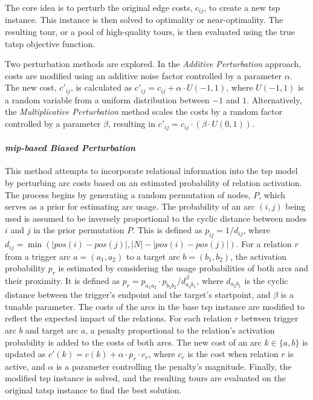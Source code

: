 \documentclass[twocolumn, switch]{article} %
\begin{document}
The core idea is to perturb the original edge costs, $c_{ij}$, to create a new \gls{tsp} instance.
This instance is then solved to optimality or near-optimality. The resulting tour, or a pool of high-quality tours, is then evaluated using the true \gls{tatsp} objective function.

Two perturbation methods are explored. In the \textit{Additive Perturbation} approach, costs are modified using an additive noise factor controlled by a parameter $\alpha$. The new cost, $c'_{ij}$, is calculated as $c'_{ij} = c_{ij} + \alpha \cdot U(-1, 1)$, where $U(-1, 1)$ is a random variable from a uniform distribution between $-1$ and $1$. Alternatively, the \textit{Multiplicative Perturbation} method scales the costs by a random factor controlled by a parameter $\beta$, resulting in $c'_{ij} = c_{ij} \cdot (\beta \cdot U(0, 1))$.

\paragraph{\textit{\gls{mip}-based Biased Perturbation}}
This method attempts to incorporate relational information into the \gls{tsp} model by perturbing arc costs based on an estimated probability of relation activation. The process begins by generating a random permutation of nodes, $P$, which serves as a prior for estimating arc usage. The probability of an arc $(i, j)$ being used is assumed to be inversely proportional to the cyclic distance between nodes $i$ and $j$ in the prior permutation $P$. This is defined as $p_{ij} = 1/d_{ij}$, where $d_{ij} = \min(|pos(i)-pos(j)|, |N| - |pos(i)-pos(j)|)$. For a relation $r$ from a trigger arc $a=(a_1, a_2)$ to a target arc $b=(b_1, b_2)$, the activation probability $p_r$ is estimated by considering the usage probabilities of both arcs and their proximity. It is defined as $p_r = p_{a_1a_2} \cdot p_{b_1b_2} / d_{a_2b_1}^\beta$, where $d_{a_2b_1}$ is the cyclic distance between the trigger's endpoint and the target's startpoint, and $\beta$ is a tunable parameter. The costs of the arcs in the base \gls{tsp} instance are modified to reflect the expected impact of the relations. For each relation $r$ between trigger arc $b$ and target arc $a$, a penalty proportional to the relation's activation probability is added to the costs of both arcs. The new cost of an arc $k \in \{a,b\}$ is updated as $c'(k) = c(k) + \alpha \cdot p_r \cdot c_r$, where $c_r$ is the cost when relation $r$ is active, and $\alpha$ is a parameter controlling the penalty's magnitude. Finally, the modified \gls{tsp} instance is solved, and the resulting tours are evaluated on the original \gls{tatsp} instance to find the best solution.
\end{document}
